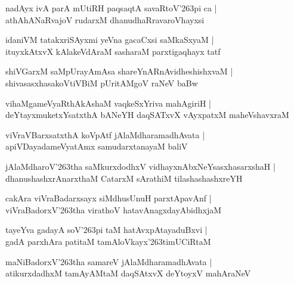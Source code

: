 \documentclass[twoside,12pt,openright]{book}
\def\S{\char'263}
\newcounter{shloka}[chapter]
\begin{document}
\begin{shloka}%
nadAyx ivA parA mUtiRH paqsaqtA savaRtoV\S pi ca |\\
athAhANaRvajoV rudarxM dhanudhaRravaroVhayxsi 
\end{shloka}

\begin{shloka}%
idaniVM tatakxriSAyxmi yeVna gacaCxsi saMkaSxyaM |\\
ituyxkAtxvX kAlakeVdAraM sasharaM parxtigaqhayx tatf
\end{shloka}

\begin{shloka}%
shiVGarxM saMpUrayAmAsa shareYnARnAvidheshishxvaM |\\
shivasasxhasakoVtiVBiM pUritAMgoV raNeV baBw
\end{shloka}

\begin{shloka}%
vihaMgameVyaRthAkAshaM vaqkeSxYriva mahAgiriH |\\
deYtayxmuketxYsatxthA bANeYH daqSATxvX vAyxpatxM maheVshavxraM
\end{shloka}

\begin{shloka}%
viVraVBarxsatxthA koVpAtf jAlaMdharamadhAvata |\\
apiVDayadameVyatAmx samudarxtanayaM baliV 
\end{shloka}

\begin{shloka}%
jAlaMdharoV\S tha saMkurxdodhxV vidhayxnAbxNeYsasxhasarxshaH |\\
dhanushashxrAnarxthaM CatarxM sArathiM tilashashashxreYH 
\end{shloka}

\begin{shloka}%
cakAra viVraBadarxsayx siMdhusUnuH parxtApavAnf |\\
viVraBadorxV\S tha virathoV hatavAnagxdayAbidhxjaM 
\end{shloka}

\begin{shloka}%
tayeYva gadayA soV\S pi taM hatAvxpAtayaduBxvi |\\
gadA parxhAra patitaM tamAloVkayx\S timUCiRtaM 
\end{shloka}

\begin{shloka}%
maNiBadorxV\S tha samareV jAlaMdharamadhAvata |\\
atikurxdadhxM tamAyAMtaM daqSAtxvX deYtoyxV mahAraNeV 
\end{shloka}
\end{document}
